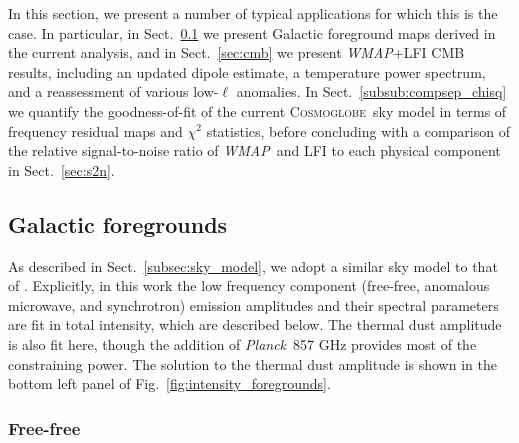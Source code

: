 \documentclass[twocolumn]{../../common/aa}
\def\WMAP{\emph{WMAP}}
\def\Planck{\emph{Planck}}
\newcommand{\bp}{\textsc{BeyondPlanck}}
\newcommand{\cosmoglobe}{\textsc{Cosmoglobe}}
\newcommand{\K}[0]{\textit K}
\newcommand{\W}[0]{\textit W}
\begin{document}
In this section, we present a number of typical applications for which this is the case. In particular, in Sect.~\ref{subsec:foregrounds} we present Galactic foreground maps derived in the current analysis, and in Sect.~\ref{sec:cmb} we present \WMAP+LFI CMB results, including an updated dipole estimate, a temperature power spectrum, and a reassessment of various low-$\ell$ anomalies. In Sect.~\ref{subsub:compsep_chisq} we quantify the goodness-of-fit of the current \cosmoglobe\ sky model in terms of frequency residual maps and $\chi^2$ statistics, before concluding with a comparison of the relative signal-to-noise ratio of \WMAP\ and LFI to each physical component in Sect.~\ref{sec:s2n}. 


\subsection{Galactic foregrounds}\label{subsec:foregrounds}

As described in Sect.~\ref{subsec:sky_model}, we adopt a similar sky model to that of \cite{bp01}. Explicitly, in this work the low frequency component (free-free, anomalous microwave, and synchrotron) emission amplitudes and their spectral parameters are fit in total intensity, which are described below. The thermal dust amplitude is also fit here, though the addition of \Planck\ 857 GHz provides most of the constraining power. The solution to the thermal dust amplitude is shown in the bottom left panel of Fig.~\ref{fig:intensity_foregrounds}. %

\subsubsection{Free-free}\label{subsubsec:ff}
\end{document}

